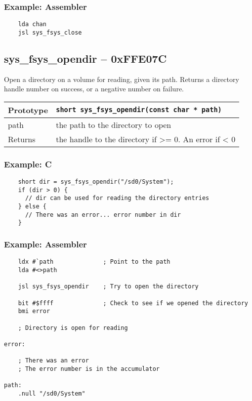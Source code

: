 \subsubsection*{Example: Assembler}
\begin{verbatim}
    lda chan
    jsl sys_fsys_close
\end{verbatim}


\subsection*{sys\_fsys\_opendir -- 0xFFE07C}
Open a directory on a volume for reading, given its path.
Returns a directory handle number on success, or a negative number on failure.

\bigskip

\begin{tabular}{|l||l|} \hline
Prototype & \lstinline!short sys_fsys_opendir(const char * path)! \\ \hline
path & the path to the directory to open \\ \hline
Returns & the handle to the directory if >= 0. An error if < 0 \\ \hline
\end{tabular}

\subsubsection*{Example: C}
\begin{lstlisting}
    short dir = sys_fsys_opendir("/sd0/System");
    if (dir > 0) {
      // dir can be used for reading the directory entries
    } else {
      // There was an error... error number in dir
    }    
\end{lstlisting}

\subsubsection*{Example: Assembler}
\begin{verbatim}
    ldx #`path              ; Point to the path
    lda #<>path

    jsl sys_fsys_opendir    ; Try to open the directory

    bit #$ffff              ; Check to see if we opened the directory
    bmi error

    ; Directory is open for reading

error:

    ; There was an error
    ; The error number is in the accumulator

path:
    .null "/sd0/System"
\end{verbatim}


